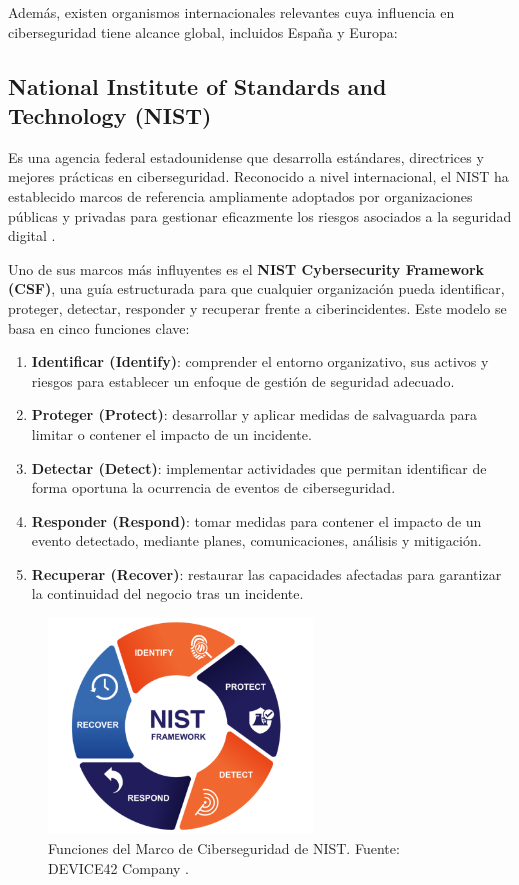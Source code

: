 \documentclass[a4paper, 11pt]{article}
\begin{document}
Además, existen organismos internacionales relevantes cuya influencia en ciberseguridad tiene alcance global, incluidos España y Europa:
\par\vspace{0.5cm}




\subsection*{National Institute of Standards and Technology (NIST)}

Es una agencia federal estadounidense que desarrolla estándares, directrices y mejores prácticas en ciberseguridad. Reconocido a nivel internacional, el NIST ha establecido marcos de referencia ampliamente adoptados por organizaciones públicas y privadas para gestionar eficazmente los riesgos asociados a la seguridad digital \cite{nist}.
\par\vspace{0.5cm}

Uno de sus marcos más influyentes es el \textbf{NIST Cybersecurity Framework (CSF)}, una guía estructurada para que cualquier organización pueda identificar, proteger, detectar, responder y recuperar frente a ciberincidentes. Este modelo se basa en cinco funciones clave:
\begin{enumerate}
\item \textbf{Identificar (Identify)}: comprender el entorno organizativo, sus activos y riesgos para establecer un enfoque de gestión de seguridad adecuado.
\item \textbf{Proteger (Protect)}: desarrollar y aplicar medidas de salvaguarda para limitar o contener el impacto de un incidente.
\item \textbf{Detectar (Detect)}: implementar actividades que permitan identificar de forma oportuna la ocurrencia de eventos de ciberseguridad.
\item \textbf{Responder (Respond)}: tomar medidas para contener el impacto de un evento detectado, mediante planes, comunicaciones, análisis y mitigación.
\item \textbf{Recuperar (Recover)}: restaurar las capacidades afectadas para garantizar la continuidad del negocio tras un incidente.
\end{enumerate}

\begin{figure}[H]
\centering
\includegraphics[width=7cm]{images/nist_framework.png}
\caption{Funciones del Marco de Ciberseguridad de NIST. Fuente: DEVICE42 Company \cite{device42}.}
\label{fig:nist-framework}
\end{figure}
\end{document}
